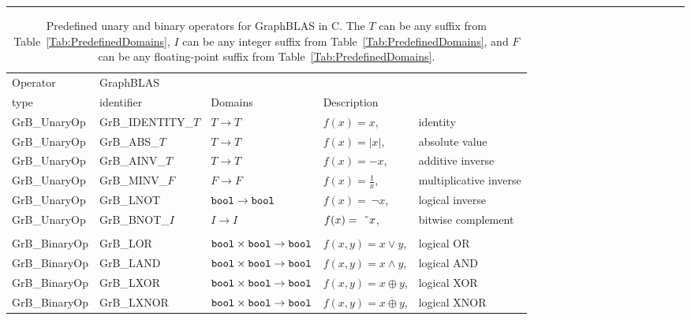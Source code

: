 \begin{table}
\hspace*{-2.5em}\begin{threeparttable}
\hrule
\caption{Predefined unary and binary operators for GraphBLAS in C.  The $T$ can 
be any suffix from Table~\ref{Tab:PredefinedDomains}, $I$ can be any integer 
suffix from Table~\ref{Tab:PredefinedDomains}, and $F$ can be any floating-point suffix from Table~\ref{Tab:PredefinedDomains}.}
\label{Tab:PredefOperators}
\vspace{1\baselineskip}

\begin{tabular}{l|l|l|ll}
Operator & GraphBLAS             &                                                              & \\
type     & identifier            & Domains                                              & Description \\ \hline
{\sf GrB\_UnaryOp}    & {\sf GrB\_IDENTITY\_$T$} & $T \rightarrow T $     & $f(x) = x$, &identity \\
{\sf GrB\_UnaryOp}    & {\sf GrB\_ABS\_$T$}      & $T \rightarrow T $     & $f(x) = |x|$, &absolute value \\
{\sf GrB\_UnaryOp}    & {\sf GrB\_AINV\_$T$}     & $T \rightarrow T $     & $f(x) = -x$, &additive inverse \\
{\sf GrB\_UnaryOp}    & {\sf GrB\_MINV\_$F$}     & $F \rightarrow F $     & $f(x) = \frac{1}{x}$, &multiplicative inverse \\
{\sf GrB\_UnaryOp}    & {\sf GrB\_LNOT}          & ${\tt bool} \rightarrow {\tt bool}$  & $f(x) =~\neg x$, &logical inverse  \\
{\sf GrB\_UnaryOp}    & {\sf GrB\_BNOT\_$I$}     & $I \rightarrow I$      & $f(x) =~\mbox{\~{}} x$, &bitwise complement \\

&&&\\
{\sf GrB\_BinaryOp}   & {\sf GrB\_LOR}        & ${\tt bool} \times {\tt bool} \rightarrow {\tt bool}$ & $f(x,y) = x \lor y$, & logical OR \\
{\sf GrB\_BinaryOp}   & {\sf GrB\_LAND}       & ${\tt bool} \times {\tt bool} \rightarrow {\tt bool}$ & $f(x,y) = x \land y$, & logical AND \\
{\sf GrB\_BinaryOp}   & {\sf GrB\_LXOR}       & ${\tt bool} \times {\tt bool} \rightarrow {\tt bool}$ & $f(x,y) = x \oplus y$, & logical XOR \\
{\sf GrB\_BinaryOp}   & {\sf GrB\_LXNOR}      & ${\tt bool} \times {\tt bool} \rightarrow {\tt bool}$ & $f(x,y) = \overline{x \oplus y}$, & logical XNOR \\


\end{tabular}
\end{threeparttable}
\end{table}
